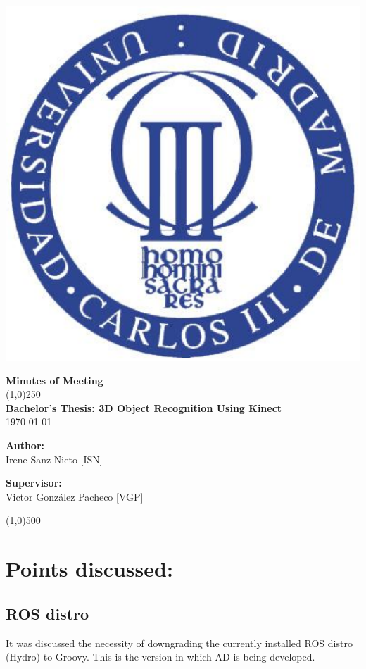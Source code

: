 \documentclass{article}
\newenvironment{myindentpar}[1]%
 {\begin{list}{}%
         {\setlength{\leftmargin}{#1}}%
         \item[]%
 }
 {\end{list}}
\begin{document}
\includegraphics[width=0.1\linewidth]{../template/uc3m.eps}

\vspace{-1cm}
\begin{minipage}[b]{1\linewidth}
	\begin{center}
	{\Huge \bfseries{Minutes of Meeting}}\\
	\line(1,0){250}\\[1cm]
	{\LARGE \textbf{Bachelor's Thesis: 3D Object Recognition Using Kinect}}\\[0.5cm]
	{\large \today}
	\end{center}
\end {minipage}



\begin{minipage}{0.55\textwidth}
\begin{flushleft} \large
\textbf{{Author:}\\}
Irene Sanz Nieto [ISN]\\
\end{flushleft}
\end{minipage}
\begin{minipage}{0.4\textwidth}
\begin{flushright} \large
\textbf{Supervisor: }\\
Victor González Pacheco [VGP]
\end{flushright}\end{minipage}

\begin{center}
\line(1,0){500}
\end{center}

\renewcommand{\thesubsection}
{\hspace*{1cm} \arabic{section}.\arabic{subsection}}



\section{\LARGE Points discussed: }
	\subsection{ROS distro}
		\begin{myindentpar}{1cm} 
		It was discussed the necessity of downgrading the currently installed ROS distro (Hydro) to Groovy. This is the version in which AD is being developed.  
		\end{myindentpar}
		
\end{document}
